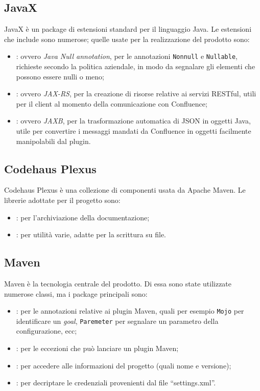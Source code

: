 \subsection{JavaX}
JavaX è un package di estensioni standard per il linguaggio Java.
Le estensioni che include sono numerose; quelle usate per la realizzazione del prodotto sono:
\begin{itemize}
    \item {}: ovvero \emph{Java Null annotation}, per le annotazioni  \texttt{Nonnull} e  \texttt{Nullable}, richieste secondo la politica aziendale, in modo da segnalare gli elementi che possono essere nulli o meno;
    \item {}: ovvero \emph{JAX-RS}, per la creazione di risorse relative ai servizi RESTful, utili per il client al momento della comunicazione con Confluence;
    \item {}: ovvero \emph{JAXB}, per la trasformazione automatica di JSON in oggetti Java, utile per convertire i messaggi mandati da Confluence in oggetti facilmente manipolabili dal plugin.
\end{itemize}


\subsection{Codehaus Plexus}
Codehaus Plexus è una collezione di componenti usata da Apache Maven.
Le librerie adottate per il progetto sono:
\begin{itemize}
    \item {}: per l'archiviazione della documentazione;
    \item {}: per utilità varie, adatte per la scrittura su file.
\end{itemize}


\subsection{Maven}
Maven è la tecnologia centrale del prodotto.
Di essa sono state utilizzate numerose classi, ma i package principali sono:
\begin{itemize}
    \item {}: per le annotazioni relative ai plugin Maven, quali per esempio \texttt{Mojo} per identificare un \emph{goal},  \texttt{Paremeter} per segnalare un parametro della configurazione, ecc;
    \item {}: per le eccezioni che può lanciare un plugin Maven;
    \item {}: per accedere alle informazioni del progetto (quali nome e versione);
    \item {}: per decriptare le credenziali provenienti dal file ``settings.xml''.
\end{itemize}



